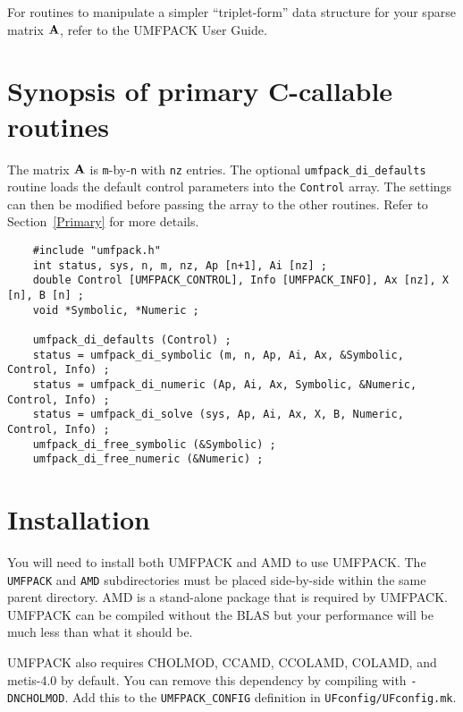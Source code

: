 \documentclass[11pt]{article}
\newcommand{\m}[1]{{\bf{#1}}}       %
\begin{document}
For routines to manipulate a simpler ``triplet-form'' data structure for your
sparse matrix $\m{A}$, refer to the UMFPACK User Guide.

\section{Synopsis of primary C-callable routines}
\label{Synopsis}

The matrix $\m{A}$ is {\tt m}-by-{\tt n} with {\tt nz} entries.
The optional {\tt umfpack\_di\_defaults} routine loads the default control
parameters into the {\tt Control} array.  The settings can then be modified
before passing the array to the other routines.  Refer to Section~\ref{Primary}
for more details.

{\footnotesize
\begin{verbatim}
    #include "umfpack.h"
    int status, sys, n, m, nz, Ap [n+1], Ai [nz] ;
    double Control [UMFPACK_CONTROL], Info [UMFPACK_INFO], Ax [nz], X [n], B [n] ;
    void *Symbolic, *Numeric ;

    umfpack_di_defaults (Control) ;
    status = umfpack_di_symbolic (m, n, Ap, Ai, Ax, &Symbolic, Control, Info) ;
    status = umfpack_di_numeric (Ap, Ai, Ax, Symbolic, &Numeric, Control, Info) ;
    status = umfpack_di_solve (sys, Ap, Ai, Ax, X, B, Numeric, Control, Info) ;
    umfpack_di_free_symbolic (&Symbolic) ;
    umfpack_di_free_numeric (&Numeric) ;
\end{verbatim}
}

\section{Installation}
\label{Install}

You will need to install both UMFPACK and AMD to use UMFPACK.
The {\tt UMFPACK} and {\tt AMD} subdirectories must be placed side-by-side
within the same parent directory.  AMD is a stand-alone package that
is required by UMFPACK.  UMFPACK can be compiled without the
BLAS
but your performance will be much less than what it should be.

UMFPACK also requires CHOLMOD, CCAMD, CCOLAMD, COLAMD, and metis-4.0
by default.  You can remove this dependency by compiling with
{\tt -DNCHOLMOD}.  Add this to the {\tt UMFPACK\_CONFIG} definition
in {\tt UFconfig/UFconfig.mk}.
\end{document}
